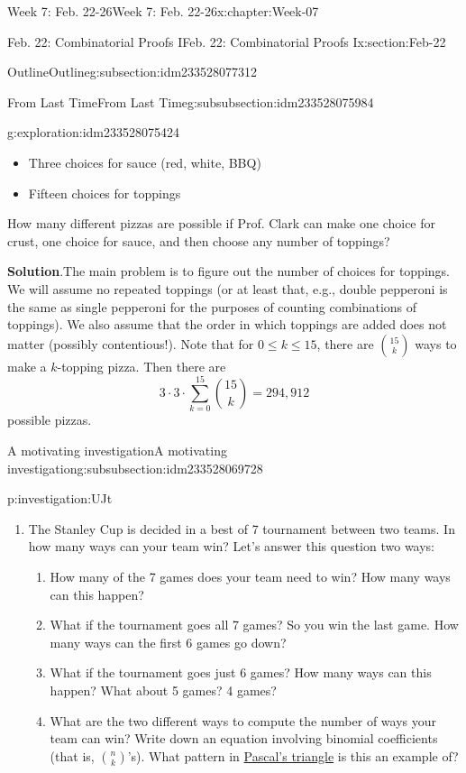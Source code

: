 \documentclass[oneside,10pt,]{book}
\newcommand{\blocktitlefont}{\relax}
\numberwithin{equation}{section}
\renewcommand{\le}{\leqslant}
\begin{document}
\begin{chapterptx}{Week 7: Feb. 22-26}{}{Week 7: Feb. 22-26}{}{}{x:chapter:Week-07}
\begin{sectionptx}{Feb. 22: Combinatorial Proofs I}{}{Feb. 22: Combinatorial Proofs I}{}{}{x:section:Feb-22}
\begin{subsectionptx}{Outline}{}{Outline}{}{}{g:subsection:idm233528077312}
\begin{subsubsectionptx}{From Last Time}{}{From Last Time}{}{}{g:subsubsection:idm233528075984}
\begin{exploration}{}{g:exploration:idm233528075424}
\begin{itemize}[label=\textbullet]
\item{}Three choices for sauce (red, white, BBQ)%
\item{}Fifteen choices for toppings%
\end{itemize}
How many different pizzas are possible if Prof. Clark can make one choice for crust, one choice for sauce, and then choose any number of toppings?%
\par\smallskip%
\noindent\textbf{\blocktitlefont Solution}.\hypertarget{g:solution:idm233528072528}{}\quad{}The main problem is to figure out the number of choices for toppings. We will assume no repeated toppings (or at least that, e.g., double pepperoni is the same as single pepperoni for the purposes of counting combinations of toppings). We also assume that the order in which toppings are added does not matter (possibly contentious!). Note that for \(0 \le k \le 15\), there are \(\binom{15}{k}\) ways to make a \(k\)-topping pizza. Then there are%
\begin{equation*}
3\cdot 3\cdot \sum\limits_{k=0}^{15} \binom{15}{k} = 294,912
\end{equation*}
possible pizzas.%
\end{exploration}%
\end{subsubsectionptx}
%
%
\typeout{************************************************}
\typeout{************************************************}
%
\begin{subsubsectionptx}{A motivating investigation}{}{A motivating investigation}{}{}{g:subsubsection:idm233528069728}
\begin{investigation}{}{p:investigation:UJt}%
%
\begin{enumerate}
\item{}The Stanley Cup is decided in a best of 7 tournament between two teams. In how many ways can your team win? Let's answer this question two ways:%
\begin{enumerate}
\item{}How many of the 7 games does your team need to win? How many ways can this happen?%
\item{}What if the tournament goes all 7 games? So you win the last game. How many ways can the first 6 games go down?%
\item{}What if the tournament goes just 6 games? How many ways can this happen? What about 5 games? 4 games?%
\item{}What are the two different ways to compute the number of ways your team can win? Write down an equation involving binomial coefficients (that is, \({n \choose k}\)'s). What pattern in \hyperref[x:image:pascal-large]{Pascal's triangle} is this an example of?%

\end{enumerate}
\end{enumerate}
\end{investigation}
\end{subsubsectionptx}
\end{subsectionptx}
\end{sectionptx}
\end{chapterptx}
\end{document}
